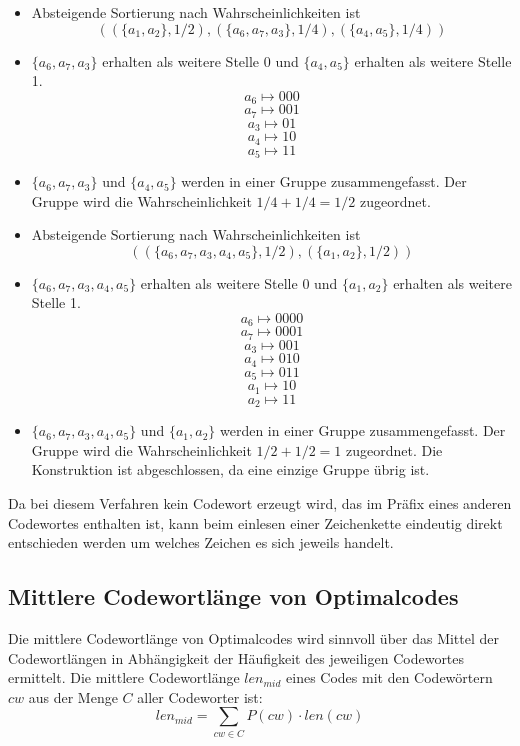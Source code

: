 \begin{itemize}
  \item Absteigende Sortierung nach Wahrscheinlichkeiten ist
  $$((\{a_1, a_2\},1/2),(\{a_6, a_7, a_3\},1/4),(\{a_4,a_5\},1/4))$$
  \item $\{a_6, a_7, a_3\}$ erhalten als weitere Stelle 0 und $\{a_4,a_5\}$ erhalten als weitere Stelle 1.
  $$ a_6 \mapsto 000 $$
  $$ a_7 \mapsto 001 $$
  $$ a_3 \mapsto 01 $$
  $$ a_4 \mapsto 10 $$
  $$ a_5 \mapsto 11 $$
  \item $\{a_6, a_7, a_3\}$ und $\{a_4,a_5\}$ werden in einer Gruppe zusammengefasst. Der Gruppe wird die Wahrscheinlichkeit $1/4 + 1/4 = 1/2$ zugeordnet.
  
  \item Absteigende Sortierung nach Wahrscheinlichkeiten ist
  $$((\{a_6, a_7, a_3, a_4, a_5\},1/2),(\{a_1, a_2\},1/2))$$
  \item $\{a_6, a_7, a_3, a_4, a_5\}$ erhalten als weitere Stelle 0 und $\{a_1, a_2\}$ erhalten als weitere Stelle 1.
  $$ a_6 \mapsto 0000 $$
  $$ a_7 \mapsto 0001 $$
  $$ a_3 \mapsto 001 $$
  $$ a_4 \mapsto 010 $$
  $$ a_5 \mapsto 011 $$
  $$ a_1 \mapsto 10 $$
  $$ a_2 \mapsto 11 $$
  \item $\{a_6, a_7, a_3, a_4, a_5\}$ und $\{a_1, a_2\}$ werden in einer Gruppe zusammengefasst. Der Gruppe wird die Wahrscheinlichkeit $1/2 + 1/2 = 1$ zugeordnet. Die Konstruktion ist abgeschlossen, da eine einzige Gruppe übrig ist.
\end{itemize}

Da bei diesem Verfahren kein Codewort erzeugt wird, das im Präfix eines anderen Codewortes enthalten ist, kann beim einlesen einer Zeichenkette eindeutig direkt entschieden werden um welches Zeichen es sich jeweils handelt.

\subsection{Mittlere Codewortlänge von Optimalcodes}
Die mittlere Codewortlänge von Optimalcodes wird sinnvoll über das Mittel der Codewortlängen in Abhängigkeit der Häufigkeit des jeweiligen Codewortes ermittelt. Die mittlere Codewortlänge $len_{mid}$ eines Codes mit den Codewörtern $cw$ aus der Menge $C$ aller Codeworter ist:
$$ len_{mid} = \sum_{cw \in C} P(cw) \cdot len(cw) $$

